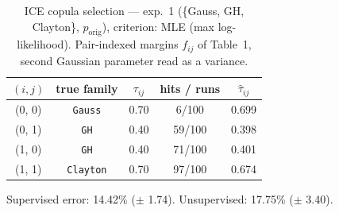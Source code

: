 \begin{table}[htbp]
  \centering
  \caption{ICE copula selection — exp.\ 1 (\{Gauss, GH, Clayton\}, $p_{\text{orig}}$), criterion: MLE (max log-likelihood). Pair-indexed margins $f_{ij}$ of Table~1, second Gaussian parameter read as a variance.}
  \label{tab:exp3-exp1_orig_p__mle}
  \begin{tabular}{ccccc}
    \toprule
    $(i, j)$ & true family & $\tau_{ij}$ & hits / runs & $\hat\tau_{ij}$ \\
    \midrule
    (0, 0) & \texttt{Gauss} & 0.70 & 6/100 & 0.699 \\
    (0, 1) & \texttt{GH} & 0.40 & 59/100 & 0.398 \\
    (1, 0) & \texttt{GH} & 0.40 & 71/100 & 0.401 \\
    (1, 1) & \texttt{Clayton} & 0.70 & 97/100 & 0.674 \\
    \bottomrule
  \end{tabular}
  \par\smallskip Supervised error: 14.42\% ($\pm$ 1.74). Unsupervised: 17.75\% ($\pm$ 3.40).
\end{table}
